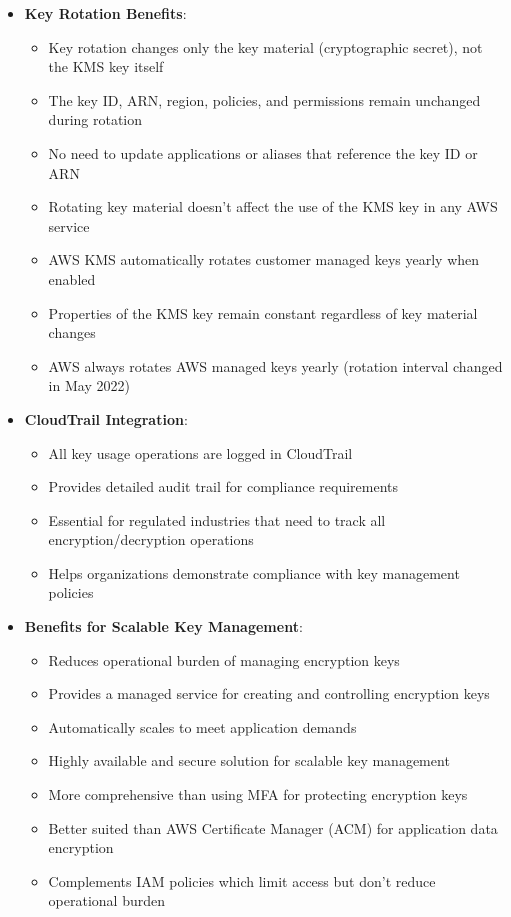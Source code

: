 \documentclass[11pt,a4paper]{report}
\begin{document}
\begin{itemize}
  \item \textbf{Key Rotation Benefits}:
\begin{itemize}
  \item Key rotation changes only the key material (cryptographic secret), not the KMS key itself
  \item The key ID, ARN, region, policies, and permissions remain unchanged during rotation
  \item No need to update applications or aliases that reference the key ID or ARN
  \item Rotating key material doesn't affect the use of the KMS key in any AWS service
  \item AWS KMS automatically rotates customer managed keys yearly when enabled
  \item Properties of the KMS key remain constant regardless of key material changes
  \item AWS always rotates AWS managed keys yearly (rotation interval changed in May 2022)
\end{itemize}
  \item \textbf{CloudTrail Integration}:
\begin{itemize}
  \item All key usage operations are logged in CloudTrail
  \item Provides detailed audit trail for compliance requirements
  \item Essential for regulated industries that need to track all encryption/decryption operations
  \item Helps organizations demonstrate compliance with key management policies
\end{itemize}
  \item \textbf{Benefits for Scalable Key Management}:
\begin{itemize}
  \item Reduces operational burden of managing encryption keys
  \item Provides a managed service for creating and controlling encryption keys
  \item Automatically scales to meet application demands
  \item Highly available and secure solution for scalable key management
  \item More comprehensive than using MFA for protecting encryption keys
  \item Better suited than AWS Certificate Manager (ACM) for application data encryption
  \item Complements IAM policies which limit access but don't reduce operational burden

\end{itemize}
\end{itemize}
\end{document}
